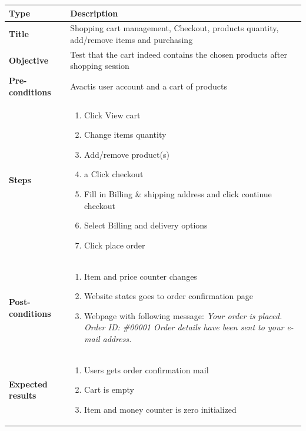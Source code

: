 \documentclass[UKenglish,12pt]{article}
\begin{document}
\begin{itemize}
\begin{table}[!htbp]
\small
\begin{tabular}{| p{5cm} | p{10cm} | }
	\hline
	\textbf{Type} & \textbf{Description} \\ \hline
	 \textbf{Title} & Shopping cart management, Checkout, products quantity, add/remove items and purchasing \\ \hline
	 \textbf{Objective} & Test that the cart indeed contains the chosen products after shopping session \\ \hline
	 \textbf{Pre-conditions} & Avactis user account and a cart of products \\ \hline
	 \textbf{Steps} & \begin{enumerate} \item Click View cart \item Change items quantity \item Add/remove product(s) \item a Click checkout \item Fill in Billing \& shipping address and click continue checkout \item Select Billing and delivery options \item Click place order
	 \end{enumerate} \\ \hline
	\textbf{Post-conditions} & \begin{enumerate}\item Item and price counter changes \item Website states goes to order confirmation page \item Webpage with following message: \textit{Your order is placed. Order ID: \#00001 Order details have been sent to your e-mail address.}  \end{enumerate} \\ \hline
	 \textbf{Expected results} & \begin{enumerate}\item Users gets order confirmation mail \item Cart is empty \item Item and money counter is zero initialized \end{enumerate}\\ 
	 \hline
\end{tabular} %
\end{table}


\end{itemize}
\end{document}
